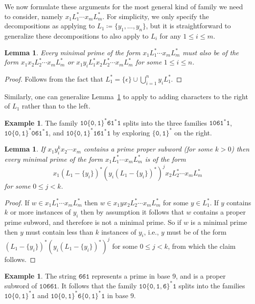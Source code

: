 \documentclass[12pt]{article}
\theoremstyle{plain}
\newtheorem{lemma}[theorem]{Lemma}
\theoremstyle{definition}
\newtheorem{example}[theorem]{Example}
\theoremstyle{remark}
\newcommand{\0}{\mathtt{0}}
\newcommand{\1}{\mathtt{1}}
\newcommand{\2}{\mathtt{2}}
\newcommand{\3}{\mathtt{3}}
\newcommand{\4}{\mathtt{4}}
\newcommand{\5}{\mathtt{5}}
\newcommand{\6}{\mathtt{6}}
\newcommand{\7}{\mathtt{7}}
\newcommand{\8}{\mathtt{8}}
\newcommand{\9}{\mathtt{9}}
\begin{document}
We now formulate these arguments for the most general kind of family we need to consider, namely
$x_1L_1^*\dotsm x_mL_m^*$.  For simplicity, we only specify the decompositions as applying to
$L_1\coloneqq\{y_1,\dotsc,y_n\}$, but it is straightforward to generalize these decompositions
to also apply to $L_i$ for any $1\leq i\leq m$.

\begin{lemma}\label{lemexplore}
Every minimal prime of the form $x_1L_1^*\dotsm x_mL_m^*$ must also be of the form
$x_1x_2L_2^*\dotsm x_mL_m^*$ or $x_1y_iL_1^*x_2L_2^*\dotsm x_mL_m^*$ for some $1\leq i\leq n$.
\end{lemma}
\begin{proof}
Follows from the fact that $L_1^*=\{\epsilon\}\cup\bigcup_{i=1}^n y_iL_1^*$.
\end{proof}
Similarly, one can generalize Lemma~\ref{lemexplore} to apply to adding characters to the right of $L_1$ rather than
to the left.
\begin{example}
The family $\1\0\{\0,\1\}^*\6\1^*\1$ splits into the three families $\1\0\6\1^*\1$, $\1\0\{\0,\1\}^*\0\6\1^*\1$, and $\1\0\{\0,\1\}^*\1\6\1^*\1$
by exploring $\{\0,\1\}^*$ on the right.
\end{example}

\begin{lemma}\label{lemsplit1}
If $x_1y_i^kx_2\dotsm x_m$ contains a prime proper subword (for some $k>0$) then every minimal prime of the form
$x_1L_1^*\dotsm x_mL_m^*$ is of the form \[x_1(L_1-\{y_i\})^*(y_i(L_1-\{y_i\})^*)^jx_2L_2^*\dotsm x_mL_m^*\]
for some $0\leq j<k$.
\end{lemma}
\begin{proof}
If $w\in x_1L_1^*\dotsm x_mL_m^*$ then $w\in x_1yx_2L_2^*\dotsm x_mL_m^*$ for some $y\in L_1^*$.
If $y$ contains $k$ or more instances of $y_i$ then by assumption it follows that $w$ contains a proper prime subword,
and therefore is not a minimal prime.  So if $w$ is a minimal prime then $y$ must contain less than $k$
instances of $y_i$, i.e., $y$ must be of the form $(L_1-\{y_i\})^*(y_i(L_1-\{y_i\})^*)^j$ for some $0\leq j<k$,
from which the claim follows.
\end{proof}
\begin{example}
The string $\6\6\1$ represents a prime in base 9, and is a proper subword of $\1\0\6\6\1$.  It follows that
the family $\1\0\{\0,\1,\6\}^*\1$ splits into the families
$\1\0\{\0,\1\}^*\1$ and $\1\0\{\0,\1\}^*\6\{\0,\1\}^*\1$ in base 9.
\end{example}
\end{document}
